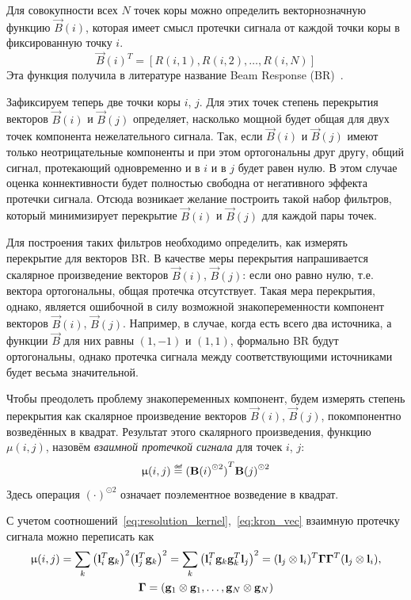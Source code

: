 Для совокупности всех $N$ точек коры можно определить векторнозначную функцию
$\vec{B}(i)$, которая имеет смысл протечки сигнала от каждой точки коры в
фиксированную точку $i$. 
\begin{equation}
    \vec{B}{(i)}^T = \left[R{(i, 1)}, R(i, 2), \ldots, R(i, N)\right]
\end{equation}
Эта функция получила в литературе название Beam Response (BR)~\cite{Sekihara2007}.


Зафиксируем теперь две точки коры $i$, $j$. Для этих точек степень перекрытия
векторов $\vec{B}(i)$ и $\vec{B}(j)$ определяет, насколько мощной будет общая
для двух точек компонента нежелательного сигнала. Так, если $\vec{B}(i)$ и
$\vec{B}(j)$ имеют только неотрицательные компоненты и при этом ортогональны
друг другу, общий сигнал, протекающий одновременно и в $i$ и в $j$ будет равен
нулю. В этом случае оценка коннективности будет полностью свободна от
негативного эффекта протечки сигнала. Отсюда возникает желание построить такой
набор фильтров, который минимизирует перекрытие $\vec{B}(i)$ и $\vec{B}(j)$ для
каждой пары точек.

Для построения таких фильтров необходимо определить, как измерять перекрытие
для векторов BR. В качестве меры перекрытия напрашивается скалярное
произведение векторов $\vec{B}(i)$, $\vec{B}(j)$: если оно равно нулю, т.е.
вектора ортогональны, общая протечка отсутствует. Такая мера перекрытия,
однако, является ошибочной в силу возможной знакопеременности компонент
векторов $\vec{B}(i)$, $\vec{B}(j)$. Например, в случае, когда есть всего два
источника, а функции $\vec{B}$ для них равны $(1, -1)$ и $(1, 1)$, формально BR
будут ортогональны, однако протечка сигнала между соответствующими источниками
будет весьма значительной.

Чтобы преодолеть проблему знакопеременных компонент, будем измерять степень
перекрытия как скалярное произведение векторов $\vec{B}(i)$, $\vec{B}(j)$,
покомпонентно возведённых в квадрат. Результат
этого скалярного произведения, функцию $\mu(i, j)$, назовём \emph{взаимной
протечкой сигнала} для точек $i$, $j$:
\begin{equation}
    \mu(i, j) \defeq {(\vec{B}{(i)}^{\odot 2})}^T \vec{B}{(j)}^{\odot 2}
    \label{eq:def_mutual_leakage}
\end{equation}
Здесь операция ${(\cdot)}^{\odot 2}$ означает поэлементное возведение в квадрат.

С учетом соотношений~\ref{eq:resolution_kernel},~\ref{eq:kron_vec} взаимную протечку сигнала можно переписать как
\begin{multline}
    \upmu(i, j)= \sum_k {\left(\mathbf{l}_i^T \mathbf{g}_k\right)}^2{\left(\mathbf{l}_j^T \mathbf{g}_k\right)}^2=
    \sum_k\left(\mathbf{l}_i^T \mathbf{g}_k\mathbf{g}_k^T \mathbf{l}_j\right)^2=(\mathbf{l}_j \otimes \mathbf{l}_i)^T \mathbf{\Gamma} \mathbf{\Gamma}^T(\mathbf{l}_j \otimes \mathbf{l}_i),\\
    \mathbf{\Gamma} = (\mathbf{g}_1 \otimes \mathbf{g}_1, \ldots, \mathbf{g}_N \otimes \mathbf{g}_N)
\end{multline}

